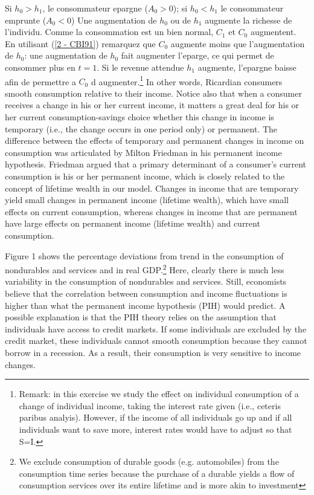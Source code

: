 \documentclass[a4paper,11pt]{article}
\begin{document}
\begin{enumerate}
Si $h_0>h_1$, le consommateur epargne ($A_{0}>0$); si $h_0<h_1$ le consommateur emprunte ($A_{0}<0$) Une augmentation de $h_0$ ou de $h_1$ augmente la richesse de l'individu. Comme la consommation est un bien normal, $C_1$ et $C_0$ augmentent. En utilisant (\ref{2 - CBI91}) remarquez que $C_0$ augmente moins que l'augmentation de $h_0$: une augmentation de $h_0$ fait augmenter l'eparge, ce qui permet de consommer plus en $t=1$. Si le revenue attendue $h_1$ augmente, l'epargne baisse afin de permettre a $C_0$ d augmenter.\footnote{Remark: in this exercise we study the effect on individual consumption of a change of individual income, taking the interest rate given (i.e., ceteris paribus analyis). However, if the income of all individuals go up and if all individuals want to save more, interest rates would have to adjust so that S=I.}   In other words, Ricardian consumers smooth consumption relative to their income. Notice also that when a consumer receives a change in his or her current income, it matters a great deal for his or her current consumption-savings choice whether this change in income is temporary (i.e., the change occurs in one period only) or permanent. The difference between the effects of temporary and permanent changes in income on consumption was articulated by Milton Friedman in his permanent income hypothesis. Friedman argued that a primary determinant of a consumer’s current consumption is his or her permanent income, which is closely related to the concept of lifetime wealth in our model. Changes in income that are temporary yield small changes in permanent income (lifetime wealth), which have small effects on current consumption, whereas changes in income that are permanent have large effects on permanent income (lifetime wealth) and current consumption.


Figure 1 shows the percentage deviations from trend in the consumption of nondurables and services and in real GDP.\footnote{We exclude  consumption of durable goods (e.g. automobiles) from the consumption time series because the purchase of a durable yields a flow of consumption services over its entire lifetime and is more akin to investment} Here, clearly there is much less variability in the consumption of nondurables and services. Still, economists believe that the correlation between consumption and income fluctuations is higher than what the permanent income hypothesis (PIH) would predict. A possible explanation is that the PIH theory relies on the assumption that individuals have access to credit markets. If some individuals are excluded by the credit market, these individuals cannot smooth consumption because they cannot borrow in a recession. As a result, their consumption is very sensitive to income changes.



\end{enumerate}
\end{document}
